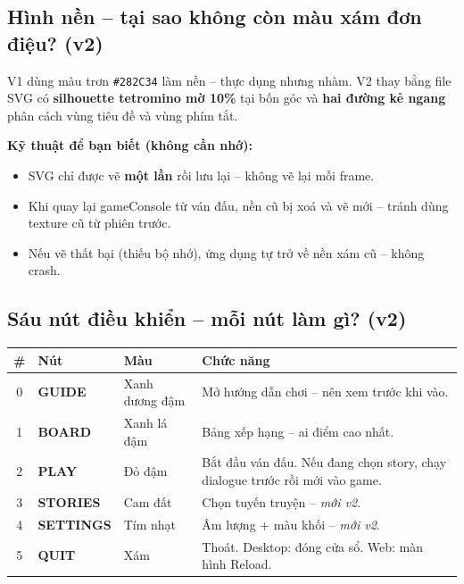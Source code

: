 \documentclass[12pt,a4paper]{article}
\begin{document}
\subsection{Hình nền -- tại sao không còn màu xám đơn điệu? (v2)}

V1 dùng màu trơn \texttt{\#282C34} làm nền -- thực dụng nhưng nhàm.
V2 thay bằng file SVG có \textbf{silhouette tetromino mờ 10\%} tại
bốn góc và \textbf{hai đường kẻ ngang} phân cách vùng tiêu đề và
vùng phím tắt.

\noindent\textbf{Kỹ thuật để bạn biết (không cần nhớ):}
\begin{itemize}
    \item SVG chỉ được vẽ \textbf{một lần} rồi lưu lại -- không vẽ lại mỗi frame.
    \item Khi quay lại gameConsole từ ván đấu, nền cũ bị xoá và vẽ mới --
          tránh dùng texture cũ từ phiên trước.
    \item Nếu vẽ thất bại (thiếu bộ nhớ), ứng dụng tự trở về nền xám cũ --
          không crash.
\end{itemize}

\subsection{Sáu nút điều khiển -- mỗi nút làm gì? (v2)}

\vspace{4pt}
\begin{tabularx}{\linewidth}{|c|l|l|X|}
    \hline
    \textbf{\#} & \textbf{Nút}     & \textbf{Màu}       & \textbf{Chức năng} \\
    \hline
    0 & \textbf{GUIDE}    & Xanh dương đậm & Mở hướng dẫn chơi -- nên xem trước khi vào. \\
    \hline
    1 & \textbf{BOARD}    & Xanh lá đậm   & Bảng xếp hạng -- ai điểm cao nhất. \\
    \hline
    2 & \textbf{PLAY}     & Đỏ đậm        & Bắt đầu ván đấu. Nếu đang chọn story,
                                            chạy dialogue trước rồi mới vào game. \\
    \hline
    3 & \textbf{STORIES}  & Cam đất       & Chọn tuyến truyện -- \textit{mới v2}. \\
    \hline
    4 & \textbf{SETTINGS} & Tím nhạt      & Âm lượng + màu khối -- \textit{mới v2}. \\
    \hline
    5 & \textbf{QUIT}     & Xám           & Thoát. Desktop: đóng cửa sổ.
                                            Web: màn hình Reload. \\
    \hline
\end{tabularx}
\end{document}
